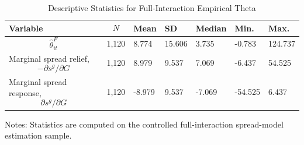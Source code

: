 \begin{table}[H]\centering
\begin{threeparttable}
\caption{Descriptive Statistics for Full-Interaction Empirical Theta}
\label{tab:theta_descriptive_stats}
\scriptsize
\begin{tabularx}{\textwidth}{lYYYYYY}
\toprule
Variable & $$N$$ & Mean & SD & Median & Min. & Max. \\
\midrule
$$\widehat{\theta}^{F}_{it}$$ & 1,120 & 8.774 & 15.606 & 3.735 & -0.783 & 124.737 \\
Marginal spread relief, $$-\partial s^g/\partial G$$ & 1,120 & 8.979 & 9.537 & 7.069 & -6.437 & 54.525 \\
Marginal spread response, $$\partial s^g/\partial G$$ & 1,120 & -8.979 & 9.537 & -7.069 & -54.525 & 6.437 \\
\bottomrule
\end{tabularx}
\begin{tablenotes}[flushleft]\footnotesize
\item Notes: Statistics are computed on the controlled full-interaction spread-model estimation sample.
\end{tablenotes}
\end{threeparttable}
\end{table}
